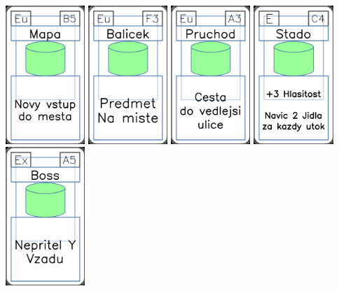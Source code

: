 \documentclass[a4paper]{article}
\begin{document}
	\includegraphics[width=3.0cm]{img-4_39}
	\includegraphics[width=3.0cm]{img-4_27}
	\includegraphics[width=3.0cm]{img-4_32}
	\includegraphics[width=3.0cm]{img-4_43}
	\includegraphics[width=3.0cm]{img-4_4}
\end{document}

